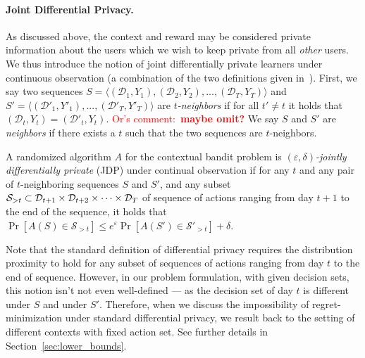 \documentclass{article}
\newcommand{\os}[1]{\textcolor{red}{Or's comment:~\textbf{#1}}}
\begin{document}
\paragraph{Joint Differential Privacy.} 
As discussed above, the context and reward may be considered private
information about the users which we wish to keep private from all \emph{other} users. We thus introduce the notion of joint differentially private learners under continuous observation (a combination of the two definitions given in~\cite{KearnsMechanismdesignlarge2014, Dwork-continual observation}). First, we say two sequences $S = \langle (\mathcal{D}_1, Y_1), (\mathcal{D}_2, Y_2), ..., (\mathcal{D}_T, Y_T) \rangle$ and $S' = \langle (\mathcal{D}'_1, Y'_1), ..., (\mathcal{D}'_T, Y'_T) \rangle$ are \emph{$t$-neighbors} if for all $t'\neq t$ it holds that $(\mathcal{D}_t,Y_t) = (\mathcal{D}'_t, Y_t)$. 
\os{maybe omit?} We say $S$ and $S'$ are \emph{neighbors} if there exists a $t$ such that the two sequences are $t$-neighbors.

\begin{definition}
\label{def:JDP_continual_observation}
  A randomized algorithm $A$ for the contextual bandit problem is
  \emph{$(\varepsilon,\delta)$-jointly differentially private} (JDP) under continual observation if for any $t$ and any pair of $t$-neighboring sequences $S$ and $S'$, and any subset ${\cal S}_{>t} \subset \mathcal{D}_{t+1} \times \mathcal{D}_{t+2} \times \cdots \times \mathcal{D}_{T}$ of sequence of actions ranging from day $t+1$ to the end of the sequence, it holds that $\Pr[A(S)\in \mathcal{S}_{>t}] \leq e^\varepsilon\Pr[A(S')\in \mathcal{S}'_{>t}] +\delta$.
\end{definition}
Note that the standard definition of differential privacy requires the distribution proximity to hold for any subset of sequences of actions ranging from day $t$ to the end of sequence. However, in our problem formulation, with given decision sets, this notion isn't not even well-defined --- as the decision set of day $t$ is different under $S$ and under $S'$. Therefore, when we discuss the impossibility of regret-minimization under standard differential privacy, we result back to the setting of different contexts with fixed action set. See further details in Section~\ref{sec:lower_bounds}.
\end{document}
